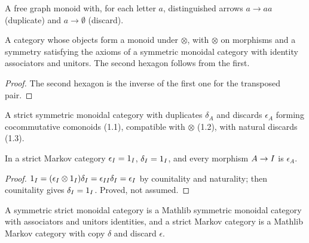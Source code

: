 \begin{definition}
\label{intro:dd-graph-monoid}
\leanok
{}
A free graph monoid with, for each letter $a$, distinguished arrows
$a \to aa$ (duplicate) and $a \to \emptyset$ (discard).
\end{definition}

\begin{definition}
\label{intro:strict-smc}
\leanok
A category whose objects form a monoid under $\otimes$, with $\otimes$ on
morphisms and a symmetry satisfying the axioms of a symmetric monoidal category
with identity associators and unitors. The second hexagon follows from the first.
\end{definition}

\begin{proof}
\leanok
The second hexagon is the inverse of the first one for the transposed pair.
\end{proof}

\begin{definition}
\label{intro:strict-markov}
\leanok
{}
A strict symmetric monoidal category with duplicates $\delta_A$ and discards
$\epsilon_A$ forming cocommutative comonoids (1.1), compatible with $\otimes$
(1.2), with natural discards (1.3).
\end{definition}

\begin{lemma}[$\epsilon_\moi = 1$, $\delta_\moi = 1$; Fritz, Remark 2.3]
\label{intro:unit}
\leanok
{}
In a strict Markov category $\epsilon_I = 1_I$, $\delta_I = 1_I$, and
every morphism $A \to I$ is $\epsilon_A$.
\end{lemma}

\begin{proof}
\leanok
$1_I = (\epsilon_I \otimes 1_I)\delta_I = \epsilon_{II}\delta_I
= \epsilon_I$ by counitality and naturality; then counitality gives
$\delta_I = 1_I$. Proved, not assumed.
\end{proof}

\begin{theorem}
\label{intro:bridge}
\leanok
{}
A symmetric strict monoidal category is a Mathlib symmetric monoidal category
with associators and unitors identities, and a strict Markov category is a
Mathlib Markov category with copy $\delta$ and discard $\epsilon$.
\end{theorem}

